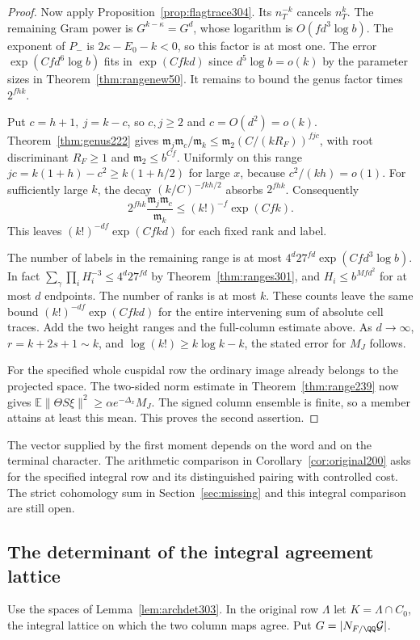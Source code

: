 \documentclass[a4paper,11pt]{article}
\theoremstyle{definition}
\theoremstyle{remark}
\numberwithin{equation}{section}
\begin{document}
\begin{proof}
Now apply Proposition~\ref{prop:flagtrace304}.
Its \(n_T^{-k}\) cancels \(n_T^k\). The remaining Gram power
is \(G^{k-\kappa}=G^d\), whose logarithm is \(O(fd^3\log b)\).
The exponent of \(P_-\) is \(2\kappa-E_0-k<0\), so this
factor is at most one. The error \(\exp(Cfd^6\log b)\)
fits in \(\exp(Cfkd)\) since \(d^5\log b=o(k)\) by the
parameter sizes in Theorem~\ref{thm:rangenew50}.
It remains to bound the genus factor times \(2^{fhk}\).

Put \(c=h+1,\ j=k-c\), so \(c,j\ge2\) and \(c=O(d^2)=o(k)\).
Theorem~\ref{thm:genus222} gives
\(\mathfrak m_j\mathfrak m_c/\mathfrak m_k
\le \mathfrak m_2(C/(kR_F))^{fjc}\), with root
discriminant \(R_F\ge1\) and \(\mathfrak m_2\le b^{Cf}\).
Uniformly on this range \(jc=k(1+h)-c^2\ge k(1+h/2)\)
for large \(x\), because \(c^2/(kh)=o(1)\).
For sufficiently large \(k\), the decay
\((k/C)^{-fkh/2}\) absorbs \(2^{fhk}\).
Consequently
\[
       2^{fhk}\frac{\mathfrak m_j\mathfrak m_c}{\mathfrak m_k}
                           \le (k!)^{-f}\exp(Cfk).
\]
This leaves \((k!)^{-df}\exp(Cfkd)\) for each fixed
rank and label.

The number of labels in the remaining range is at most
\(4^d27^{fd}\exp(Cfd^3\log b)\). In fact
\(\sum_\gamma\prod_i H_i^{-3}\le4^d27^{fd}\) by
Theorem~\ref{thm:ranges301}, and \(H_i\le b^{Mfd^2}\)
for at most \(d\) endpoints. The number of ranks is
at most \(k\). These counts leave the same bound
\((k!)^{-df}\exp(Cfkd)\) for the entire intervening
sum of absolute cell traces. Add the two height ranges
and the full-column estimate above. As \(d\to\infty\),
\(r=k+2s+1\sim k\), and \(\log(k!)\ge k\log k-k\), the
stated error for \(M_J\) follows.

For the specified whole cuspidal row the ordinary image
already belongs to the projected space. The two-sided
norm estimate in Theorem~\ref{thm:range239} now gives
\(\mathbb E\|\Theta S\xi\|^2\ge\alpha e^{-\Delta_x} M_J\).
The signed column ensemble is finite, so a member
attains at least this mean. This proves the second assertion.
\end{proof}

The vector supplied by the first moment depends on the word
and on the terminal character. The arithmetic comparison
in Corollary~\ref{cor:original200} asks for the specified
integral row and its distinguished pairing with controlled
cost. The strict cohomology sum in Section~\ref{sec:missing} and this
integral comparison are still open.

\subsection{The determinant of the integral agreement lattice}\label{nav:VIII-58}
Use the spaces of Lemma~\ref{lem:archdet303}. In the original
row \(\Lambda\) let \(K=\Lambda\cap C_0\), the integral lattice
on which the two column maps agree. Put \(G=|N_{F/\QQ}\mathcal G|\).
\end{document}
